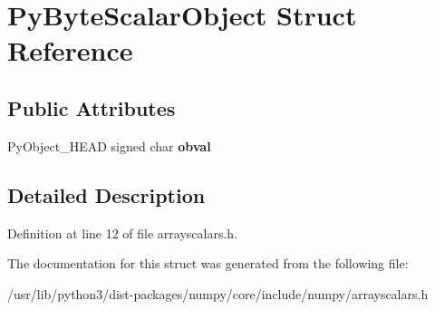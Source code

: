 \hypertarget{structPyByteScalarObject}{}\section{Py\+Byte\+Scalar\+Object Struct Reference}
\label{structPyByteScalarObject}
\subsection*{Public Attributes}
\begin{DoxyCompactItemize}
\item 
Py\+Object\+\_\+\+H\+E\+AD signed char {\bfseries obval}\hypertarget{structPyByteScalarObject_aa696cbf2e62bfcf23743872d4a30c37a}{}\label{structPyByteScalarObject_aa696cbf2e62bfcf23743872d4a30c37a}

\end{DoxyCompactItemize}


\subsection{Detailed Description}


Definition at line 12 of file arrayscalars.\+h.



The documentation for this struct was generated from the following file\+:\begin{DoxyCompactItemize}
\item 
/usr/lib/python3/dist-\/packages/numpy/core/include/numpy/arrayscalars.\+h\end{DoxyCompactItemize}
